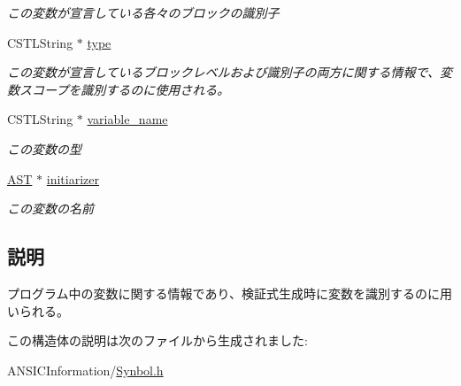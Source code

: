 \begin{DoxyCompactItemize}
\begin{DoxyCompactList}\small\item\em この変数が宣言している各々のブロックの識別子 \item\end{DoxyCompactList}\item 
CSTLString $\ast$ \hyperlink{structvariable__table_a3fbbc0d31aed9894be0bddaf8cb4af49}{type}\label{structvariable__table_a3fbbc0d31aed9894be0bddaf8cb4af49}

\begin{DoxyCompactList}\small\item\em この変数が宣言しているブロックレベルおよび識別子の両方に関する情報で、変数スコープを識別するのに使用される。 \item\end{DoxyCompactList}\item 
CSTLString $\ast$ \hyperlink{structvariable__table_a5f81ceac01a5b8c2632ddd2e1588436b}{variable\_\-name}\label{structvariable__table_a5f81ceac01a5b8c2632ddd2e1588436b}

\begin{DoxyCompactList}\small\item\em この変数の型 \item\end{DoxyCompactList}\item 
\hyperlink{structabstract__syntax__tree}{AST} $\ast$ \hyperlink{structvariable__table_ad1094019a19afcd1acf8b9242e501bf5}{initiarizer}\label{structvariable__table_ad1094019a19afcd1acf8b9242e501bf5}

\begin{DoxyCompactList}\small\item\em この変数の名前 \item\end{DoxyCompactList}\end{DoxyCompactItemize}


\subsection{説明}
プログラム中の変数に関する情報であり、検証式生成時に変数を識別するのに用いられる。 

この構造体の説明は次のファイルから生成されました:\begin{DoxyCompactItemize}
\item 
ANSICInformation/\hyperlink{Synbol_8h}{Synbol.h}\end{DoxyCompactItemize}

